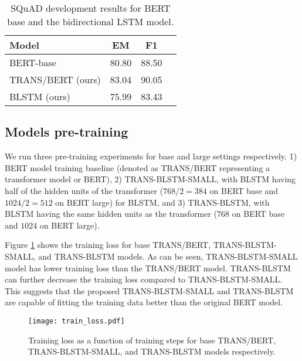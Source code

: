 \documentclass[11pt,a4paper]{article}
\begin{document}
\begin{table}[!hbpt]
\centering
    \begin{tabular}{lccc}
  Model & EM & F1 \\ \hline
  BERT-base \cite{devlin2018} & 80.80 & 88.50 \\
   TRANS/BERT (ours) & 83.04 & 90.05\\
   BLSTM (ours) & 75.99 & 83.43 \\ \hline
\end{tabular}
    \caption{SQuAD development results for BERT base and the bidirectional LSTM model.}
\label{tab:squadBLSTM}
\end{table} 

\subsection{Models pre-training}
We run three pre-training experiments for base and large settings respectively. 1) BERT model training baseline (denoted as TRANS/BERT representing a transformer model or BERT), 2) TRANS-BLSTM-SMALL, with BLSTM having half of the hidden units of the transformer ($768/2=384$ on BERT base and $1024/2=512$ on BERT large) for BLSTM, and 3) TRANS-BLSTM, with BLSTM having the same hidden units as the transformer ($768$ on BERT base and $1024$ on BERT large).

Figure \ref{fig:train_loss} shows the training loss for base TRANS/BERT, TRANS-BLSTM-SMALL, and TRANS-BLSTM models. As can be seen, TRANS-BLSTM-SMALL model has lower training loss than the TRANS/BERT model. TRANS-BLSTM can further decrease the training loss compared to TRANS-BLSTM-SMALL. This suggests that the proposed TRANS-BLSTM-SMALL and TRANS-BLSTM are capable of fitting the training data better than the original BERT model.

\begin{figure}[!hbt]
    \centering
    \texttt{[image: train\_loss.pdf]}
    \caption{Training loss as a function of training steps for base TRANS/BERT, TRANS-BLSTM-SMALL, and TRANS-BLSTM models respectively.}
    \label{fig:train_loss}
\end{figure}
\end{document}
